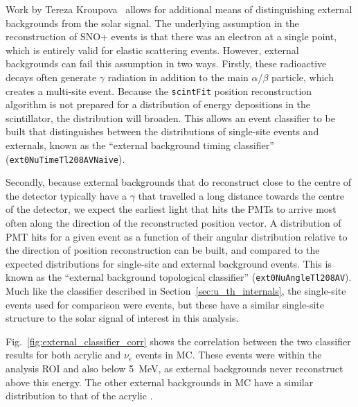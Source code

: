 Work by Tereza Kroupova~\cite{kroupovaImprovingSensitivityNeutrinoless2020} %
allows for additional means of distinguishing external backgrounds from the solar signal. The underlying assumption in the reconstruction of SNO+ events is that there was an electron at a single point, which is entirely valid for \beight{} elastic scattering events. However, external backgrounds can fail this assumption in two ways. Firstly, these radioactive decays often generate $\gamma$ radiation in addition to the main $\alpha$/$\beta$ particle, which creates a multi-site event. Because the \texttt{scintFit} position reconstruction algorithm is not prepared for a distribution of energy depositions in the scintillator, the \tres{} distribution will broaden. This allows an event classifier to be built that distinguishes between the \tres{} distributions of single-site events and externals, known as the ``external background timing classifier'' (\texttt{ext0NuTimeTl208AVNaive}).

Secondly, because external backgrounds that do reconstruct close to the centre of the detector typically have a $\gamma$ that travelled a long distance towards the centre of the detector, we expect the earliest light that hits the PMTs to arrive most often along the direction of the reconstructed position vector. A distribution of PMT hits for a given event as a function of their angular distribution relative to the direction of position reconstruction can be built, and compared to the expected distributions for single-site and external background events. This is known as the ``external background topological classifier'' (\texttt{ext0NuAngleTl208AV}). Much like the classifier described in Section~\ref{sec:u_th_internals}, the single-site events used for comparison were \onbb{} events, but these have a similar single-site structure to the solar signal of interest in this analysis.

Fig.~\ref{fig:external_classifier_corr} shows the correlation between the two classifier results for both acrylic  and \beight{} $\nu_{e}$ events in MC. These events were within the analysis ROI and also below \SI{5}{\MeV}, as external backgrounds never reconstruct above this energy. The other external backgrounds in MC have a similar distribution to that of the acrylic .

